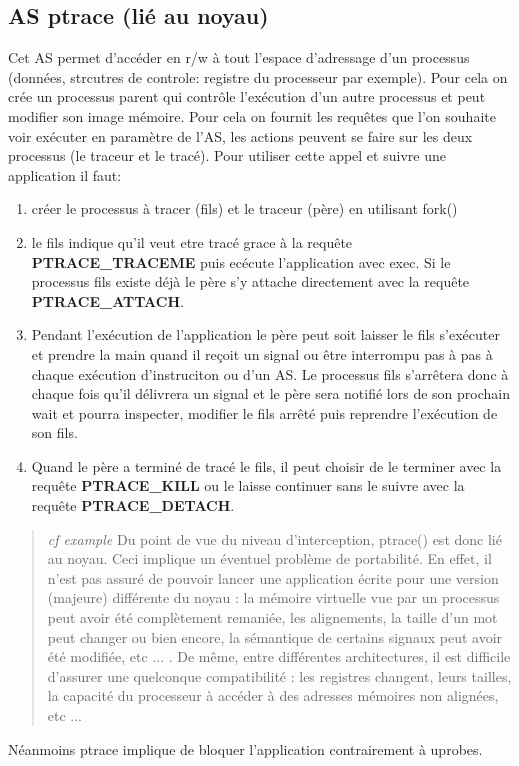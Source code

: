 \documentclass{article}
\begin{document}
\subsection{AS ptrace (lié au noyau)}
Cet AS permet d'accéder en r/w à tout l'espace d'adressage d'un processus
(données, strcutres de controle: registre du processeur par exemple). Pour cela
on crée un processus parent qui contrôle l'exécution d'un autre processus et
peut modifier son image mémoire. Pour cela on fournit les requêtes que l'on
souhaite voir exécuter en paramètre de l'AS, les actions peuvent se faire sur
les deux processus (le traceur et le tracé). Pour utiliser cette appel et suivre
une application il faut:
\begin{enumerate}
\item créer le processus à tracer (fils) et le traceur (père) en utilisant
  fork()
\item le fils indique qu'il veut etre tracé grace à la requête
  \textbf{PTRACE\_TRACEME} puis ecécute l'application avec exec. Si le processus
  fils existe déjà le père s'y attache directement avec la requête
  \textbf{PTRACE\_ATTACH}.
\item Pendant l'exécution de l'application le père peut soit laisser le fils
  s'exécuter et prendre la main quand il reçoit un signal ou être interrompu pas
  à pas à chaque exécution d'instruciton ou d'un AS. Le processus fils
  s'arrêtera donc à chaque fois qu'il délivrera un signal et le père sera
  notifié lors de son prochain wait et pourra inspecter, modifier le fils arrêté
  puis reprendre l'exécution de son fils.
\item Quand le père a terminé de tracé le fils, il peut choisir de le terminer
  avec la requête \textbf{PTRACE\_KILL} ou le laisse continuer sans le suivre
  avec la requête \textbf{PTRACE\_DETACH}.
\end{enumerate}

\begin{quotation}
\textit{cf example} {\color{green} Du point de vue du niveau d’interception,
  ptrace() est donc lié au noyau. Ceci implique un éventuel problème de
  portabilité. En effet, il n’est pas assuré de pouvoir lancer une application
  écrite pour une version (majeure) différente du noyau : la mémoire virtuelle
  vue par un processus peut avoir été complètement remaniée, les alignements, la
  taille d’un mot peut changer ou bien encore, la sémantique de certains signaux
  peut avoir été modifiée, etc ... . De même, entre différentes architectures,
  il est difficile d’assurer une quelconque compatibilité : les registres
  changent, leurs tailles, la capacité du processeur à accéder à des adresses
  mémoires non alignées, etc ...  }
\end{quotation}
Néanmoins ptrace implique de bloquer l'application contrairement à uprobes.
\end{document}
